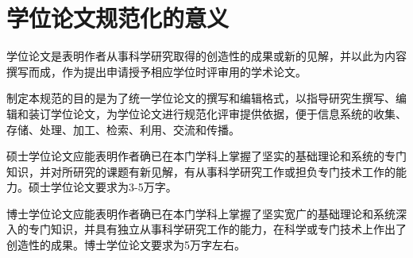 
\chapter{学位论文规范化的意义}
学位论文是表明作者从事科学研究取得的创造性的成果或新的见解，并以此为内容撰写而成，作为提出申请授予相应学位时评审用的学术论文。

制定本规范的目的是为了统一学位论文的撰写和编辑格式，以指导研究生撰写、编辑和装订学位论文，为学位论文进行规范化评审提供依据，便于信息系统的收集、存储、处理、加工、检索、利用、交流和传播。

硕士学位论文应能表明作者确已在本门学科上掌握了坚实的基础理论和系统的专门知识，并对所研究的课题有新见解，有从事科学研究工作或担负专门技术工作的能力。硕士学位论文要求为3-5万字。

博士学位论文应能表明作者确已在本门学科上掌握了坚实宽广的基础理论和系统深入的专门知识，并具有独立从事科学研究工作的能力，在科学或专门技术上作出了创造性的成果。博士学位论文要求为5万字左右。
\let\cleardoublepage\clearpage